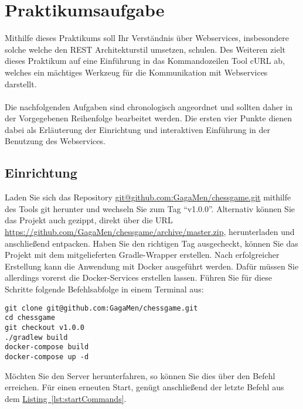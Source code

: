\chapter{Praktikumsaufgabe}\label{chap:Appendix:A}
Mithilfe dieses Praktikums soll Ihr Verständnis über Webservices, insbesondere solche welche den REST Architekturstil umsetzen, schulen. Des Weiteren zielt dieses Praktikum auf eine Einführung in das Kommandozeilen Tool cURL ab, welches ein mächtiges Werkzeug für die Kommunikation mit Webservices darstellt.\\
\\
Die nachfolgenden Aufgaben sind chronologisch angeordnet und sollten daher in der Vorgegebenen Reihenfolge bearbeitet werden. Die ersten vier Punkte dienen dabei als Erläuterung der Einrichtung und interaktiven Einführung in der Benutzung des Webservices. 

\section{Einrichtung}
Laden Sie sich das Repository \url{git@github.com:GagaMen/chessgame.git} mithilfe des Tools git herunter und wechseln Sie zum Tag \enquote{v1.0.0}. Alternativ können Sie das Projekt auch gezippt, direkt über die \gls{URL} \url{https://github.com/GagaMen/chessgame/archive/master.zip}, herunterladen und anschließend entpacken. Haben Sie den richtigen Tag ausgecheckt, können Sie das Projekt mit dem mitgelieferten Gradle-Wrapper erstellen. Nach erfolgreicher Erstellung kann die Anwendung mit Docker ausgeführt werden. Dafür müssen Sie allerdings vorerst die Docker-Services erstellen lassen. Führen Sie für diese Schritte folgende Befehlsabfolge in einem Terminal aus:\\
\begin{lstlisting}[style=lstStyleFramed, caption={Befehlsabfolge zur Einrichtung des Webservices}, label=lst:startCommands]
git clone git@github.com:GagaMen/chessgame.git
cd chessgame
git checkout v1.0.0
./gradlew build
docker-compose build
docker-compose up -d
\end{lstlisting}
Möchten Sie den Server herunterfahren, so können Sie dies über den Befehl  erreichen. Für einen erneuten Start, genügt anschließend der letzte Befehl aus dem \hyperref[lst:startCommands]{Listing~\ref{lst:startCommands}}.

